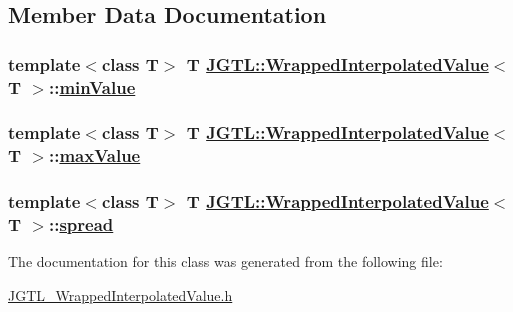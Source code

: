 \subsection{Member Data Documentation}
\hypertarget{class_j_g_t_l_1_1_wrapped_interpolated_value_7d460dd7979c409f93fc0c2d65c58a93}{
\subsubsection[minValue]{\setlength{\rightskip}{0pt plus 5cm}template$<$class T$>$ T \hyperlink{class_j_g_t_l_1_1_wrapped_interpolated_value}{JGTL::Wrapped\-Interpolated\-Value}$<$ T $>$::\hyperlink{class_j_g_t_l_1_1_wrapped_interpolated_value_7d460dd7979c409f93fc0c2d65c58a93}{min\-Value}}}
\label{class_j_g_t_l_1_1_wrapped_interpolated_value_7d460dd7979c409f93fc0c2d65c58a93}


\hypertarget{class_j_g_t_l_1_1_wrapped_interpolated_value_9781648d382fb2c4cbb90a6385189992}{
\subsubsection[maxValue]{\setlength{\rightskip}{0pt plus 5cm}template$<$class T$>$ T \hyperlink{class_j_g_t_l_1_1_wrapped_interpolated_value}{JGTL::Wrapped\-Interpolated\-Value}$<$ T $>$::\hyperlink{class_j_g_t_l_1_1_wrapped_interpolated_value_9781648d382fb2c4cbb90a6385189992}{max\-Value}}}
\label{class_j_g_t_l_1_1_wrapped_interpolated_value_9781648d382fb2c4cbb90a6385189992}


\hypertarget{class_j_g_t_l_1_1_wrapped_interpolated_value_6b4723237650b21c40b191477207c953}{
\subsubsection[spread]{\setlength{\rightskip}{0pt plus 5cm}template$<$class T$>$ T \hyperlink{class_j_g_t_l_1_1_wrapped_interpolated_value}{JGTL::Wrapped\-Interpolated\-Value}$<$ T $>$::\hyperlink{class_j_g_t_l_1_1_wrapped_interpolated_value_6b4723237650b21c40b191477207c953}{spread}}}
\label{class_j_g_t_l_1_1_wrapped_interpolated_value_6b4723237650b21c40b191477207c953}




The documentation for this class was generated from the following file:\begin{CompactItemize}
\item 
\hyperlink{_j_g_t_l___wrapped_interpolated_value_8h}{JGTL\_\-Wrapped\-Interpolated\-Value.h}\end{CompactItemize}
